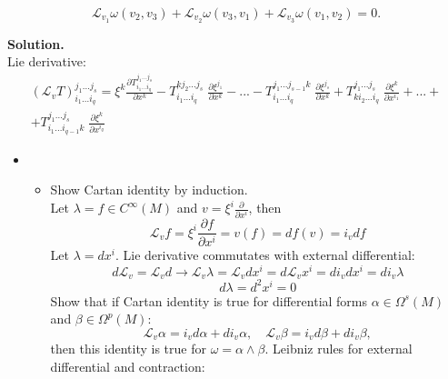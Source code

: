 \documentclass[12pt]{article}
\theoremstyle{definition}
\begin{document}
\begin{enumerate}
\begin{itemize}
    \begin{equation}
        \mathcal{L}_{v_1} \omega(v_2, v_3) + \mathcal{L}_{v_2} \omega(v_3, v_1) + \mathcal{L}_{v_3} \omega(v_1, v_2) = 0.
    \end{equation}
    \end{itemize}
    \textbf{Solution.}\\
    Lie derivative:
    \begin{multline}
        (\mathcal{L}_vT)^{j_1...j_s}_{i_1...i_q}=\xi^k\frac{\partial T^{j_1...j_s}_{i_1...i_q}}{\partial x^k}-T^{k j_2...j_s}_{i_1...i_q}\;\frac{\partial \xi^{j_1}}{\partial x^k}-...-T^{j_1...j_{s-1}k}_{i_1...i_q}\;\frac{\partial \xi^{j_s}}{\partial x^{k}}+T^{j_1...j_s}_{k i_2...i_q}\;\frac{\partial \xi^{k}}{\partial x^{i_1}}+...+\\+T^{j_1...j_{s}}_{i_1...i_{q-1}k}\;\frac{\partial \xi^{k}}{\partial x^{i_q}}
    \end{multline}  
    \begin{itemize}
        \item
        \begin{itemize}
        \item Show Cartan identity by induction.\\
        Let $\lambda=f\in C^\infty(M)$ and $v=\xi^i\frac{\partial}{\partial x^i}$, then
        \begin{equation}
            \mathcal{L}_v f =\xi^i \frac{\partial f}{\partial x^i} =v(f)=df(v) =i_vdf
        \end{equation}
        Let $\lambda=dx^i$. Lie derivative commutates with external differential:
        \begin{equation}
            d\mathcal{L}_v=\mathcal{L}_vd\rightarrow \mathcal{L}_v\lambda=\mathcal{L}_vdx^i=d\mathcal{L}_vx^i=di_vdx^i=di_v\lambda
        \end{equation}
        \begin{equation}
            d\lambda=d^2x^i=0
        \end{equation}
        Show that if Cartan identity is true for differential forms $\alpha\in\Omega^s(M)$ and $\beta\in\Omega^p(M)$:
        \begin{equation}
            \mathcal{L}_v\alpha=i_vd\alpha+di_v\alpha,\quad\mathcal{L}_v\beta=i_vd\beta+di_v\beta,
        \end{equation}
        then this identity is true for $\omega=\alpha\wedge\beta$.
        Leibniz rules for external differential and contraction:
        \begin{equation}

\end{equation}
\end{itemize}
\end{itemize}
\end{enumerate}
\end{document}
